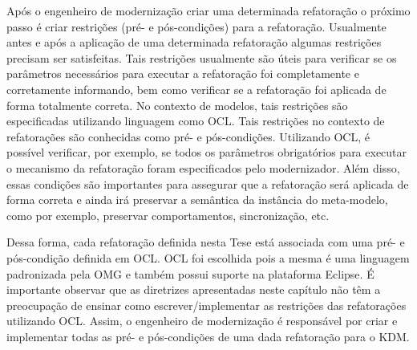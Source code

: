 Após o engenheiro de modernização criar uma determinada refatoração o próximo passo é criar restrições (pré- e pós-condições) para a refatoração. Usualmente antes e após a aplicação de uma determinada refatoração algumas restrições precisam ser satisfeitas. Tais restrições usualmente são úteis para verificar se os parâmetros necessários para executar a refatoração foi completamente e corretamente informando, bem como verificar se a refatoração foi aplicada de forma totalmente correta. No contexto de modelos, tais restrições são especificadas utilizando linguagem como OCL. Tais restrições no contexto de refatorações são conhecidas como pré- e pós-condições. Utilizando OCL, é possível verificar, por exemplo, se todos os parâmetros obrigatórios para executar o mecanismo da refatoração foram especificados pelo modernizador. Além disso, essas condições são importantes para assegurar que a refatoração será aplicada de forma correta e ainda irá preservar a semântica da instância do meta-modelo, como por exemplo, preservar comportamentos, sincronização, etc. 

Dessa forma, cada refatoração definida nesta Tese está associada com uma pré- e pós-condição definida em OCL. OCL foi escolhida pois a mesma é uma linguagem padronizada pela OMG e também possui suporte na plataforma Eclipse. É importante observar que as diretrizes apresentadas neste capítulo não têm a preocupação de ensinar como escrever/implementar as restrições das refatorações utilizando OCL. Assim, o engenheiro de modernização é responsável por criar e implementar todas as pré- e pós-condições de uma dada refatoração para o KDM.




